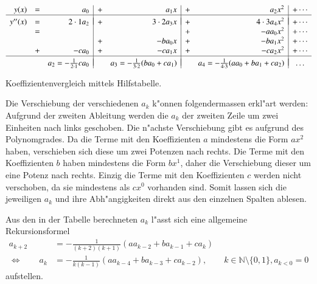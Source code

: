 \begin{table}
	\centering
	\begin{equation*}
		\begin{array}{r c r | c r | c r | c r c}
		y(x) & = &
		a_0 & + & a_1x & + & a_2x^2 & + \dotsb
		\\
		\hline&&&&&&&\\[-2ex]
		y''(x) & = &
		2\cdot1 a_2 & + & 3\cdot2 a_3x & + & 4\cdot3 a_4x^2 & + \dotsb
		\\
		& = &
		& & & + &- aa_0x^2 & + \dotsb
		\\
		& &
		& + &- ba_0x & + &- ba_1x^2 & + \dotsb
		\\
		& + &
		-ca_0 & + &- ca_1x & + &- ca_2x^2 & + \dotsb
		\\
		\hline&&&&&&&\\[-2ex]
		& &
		a_2 = -\frac{1}{2 \cdot 1}ca_0
		& & a_3 = -\frac{1}{3 \cdot 2}(ba_0+ca_1)
		& & a_4 = -\frac{1}{4 \cdot 3}(aa_0+ba_1+ca_2)
		& \dots
		\end{array}
	\end{equation*}
	\caption{Koeffizientenvergleich mittels Hilfstabelle.}
	\label{tab:wellen:koeffizietenvergleichtabelle}
\end{table}

Die Verschiebung der verschiedenen $a_k$ k"onnen folgendermassen erkl"art 
werden: Aufgrund der zweiten Ableitung werden die $a_k$ der zweiten Zeile um 
zwei Einheiten nach links geschoben. Die n"achste Verschiebung gibt es aufgrund 
des Polynomgrades. Da die Terme mit den Koeffizienten $a$ mindestens die Form 
$ax^2$ haben, verschieben sich diese um zwei Potenzen nach rechts. Die Terme 
mit den Koeffizienten $b$ haben mindestens die Form $bx^1$, daher die 
Verschiebung dieser um eine Potenz nach rechts. Einzig die Terme mit den 
Koeffizienten $c$ werden nicht verschoben, da sie mindestens als $cx^0$ 
vorhanden sind. Somit lassen sich die jeweiligen $a_k$ und ihre Abh"angigkeiten 
direkt aus den einzelnen Spalten ablesen.

Aus den in der Tabelle berechneten $a_k$ l"asst sich eine allgemeine 
Rekursionsformel
\begin{equation*}
	\begin{split}
		a_{k+2} &= -\frac{1}{(k+2)(k+1)} (aa_{k-2}+ba_{k-1}+ca_k) \\
		\Leftrightarrow \qquad
		a_k &= -\frac{1}{k(k-1)} (aa_{k-4}+ba_{k-3}+ca_{k-2}), \qquad k \in 
		\mathbb{N} \setminus \{0, 1\}, a_{k<0} = 0
	\end{split}
\end{equation*}
aufstellen.